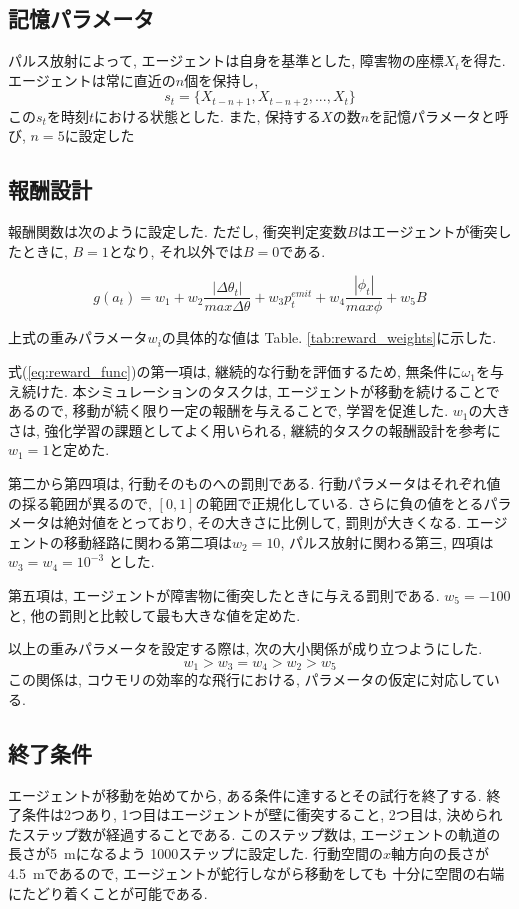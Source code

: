 \documentclass[../main]{subfiles}
\begin{document}
\subsection{記憶パラメータ}
パルス放射によって, エージェントは自身を基準とした, 
障害物の座標$X_t$を得た. 
エージェントは常に直近の$n$個を保持し, 
$$
s_t = \{X_{t-n+1}, X_{t-n+2}, ..., X_t\}
$$
この$s_t$を時刻$t$における状態とした.
また, 保持する$X$の数$n$を記憶パラメータと呼び, 
$n=5$に設定した

\subsection{報酬設計}
報酬関数は次のように設定した. 
ただし, 衝突判定変数$B$はエージェントが衝突したときに, $B=1$となり, 
それ以外では$B=0$である.

\begin{equation}
\label{eq:reward_func}
 g(a_t) = 
w_1 +
w_2 \frac{|\Delta\theta_t|}{max \Delta\theta} +
w_3 p^{emit}_t +
w_4 \frac{|\phi_t|}{max \phi} +
w_5 B
\end{equation}

上式の重みパラメータ$w_i$の具体的な値は
Table. \ref{tab:reward_weights}に示した.

式(\ref{eq:reward_func})の第一項は, 
継続的な行動を評価するため, 無条件に$\omega_1$を与え続けた.
本シミュレーションのタスクは, 
エージェントが移動を続けることであるので, 
移動が続く限り一定の報酬を与えることで, 学習を促進した.
$w_1$の大きさは, 強化学習の課題としてよく用いられる, 
継続的タスクの報酬設計を参考に$w_1=1$と定めた.

第二から第四項は, 行動そのものへの罰則である.
行動パラメータはそれぞれ値の採る範囲が異るので, 
$[0, 1]$の範囲で正規化している.
さらに負の値をとるパラメータは絶対値をとっており, 
その大きさに比例して, 罰則が大きくなる.
エージェントの移動経路に関わる第二項は$w_2=10$, 
パルス放射に関わる第三, 四項は$w_3=w_4=10^{-3}$
とした.

第五項は, エージェントが障害物に衝突したときに与える罰則である.
$w_5=-100$と, 他の罰則と比較して最も大きな値を定めた.

以上の重みパラメータを設定する際は, 
次の大小関係が成り立つようにした.
$$
w_1>w_3=w_4>w_2>w_5
$$
この関係は, コウモリの効率的な飛行における, 
パラメータの仮定に対応している.


\subsection{終了条件}
エージェントが移動を始めてから, 
ある条件に達するとその試行を終了する.
終了条件は2つあり, 1つ目はエージェントが壁に衝突すること, 
2つ目は, 決められたステップ数が経過することである.
このステップ数は, エージェントの軌道の長さが\SI{5}{\metre}になるよう
1000ステップに設定した. 
行動空間の$x$軸方向の長さが\SI{4.5}{\metre}であるので, 
エージェントが蛇行しながら移動をしても
十分に空間の右端にたどり着くことが可能である.
\end{document}
